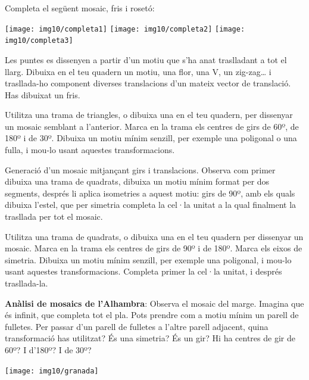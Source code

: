 \begin{mylist}
 
\exer \spen Completa el següent mosaic, fris i rosetó:
\begin{center}
	\texttt{[image: img10/completa1]}
	\texttt{[image: img10/completa2]}
	\texttt{[image: img10/completa3]}
\end{center}
	
\exer  Les puntes es dissenyen a partir d'un motiu que s'ha anat traslladant a tot el llarg. Dibuixa en el teu quadern un motiu, una flor, una V, un zig-zag{\dots} i trasllada-ho component diverses translacions d'un mateix vector de translació. Has dibuixat un fris.

 
\exer  Utilitza una trama de triangles, o dibuixa una en el teu quadern, per dissenyar un mosaic semblant a l'anterior. Marca en la trama els centres de girs de 60º, de 180º i de 30º. Dibuixa un motiu mínim senzill, per exemple una poligonal o una fulla, i mou-lo usant aquestes transformacions.

	\exer   Generació d'un mosaic mitjançant girs i translacions. Observa com primer dibuixa una trama de quadrats, dibuixa un motiu mínim format per dos segments, després li aplica isometries a aquest motiu: girs de 90º, amb els quals dibuixa l'estel, que per simetria completa la cel·la unitat a la qual finalment la trasllada per tot el mosaic. 
	
	
	
	\exer  Utilitza una trama de quadrats, o dibuixa una en el teu quadern per dissenyar un mosaic. Marca en la trama els centres de girs de 90º i de 180º. Marca els eixos de simetria. Dibuixa un motiu mínim senzill, per exemple una poligonal, i mou-lo usant aquestes transformacions. Completa primer la cel·la unitat, i després trasllada-la.
	
	\vspace{-1.5cm}
	\exer \begin{minipage}[t]{0.65\textwidth}
		 \textbf{Anàlisi de mosaics de l'Alhambra}: Observa el mosaic del marge. Imagina que és infinit, que completa tot el pla. Pots prendre com a motiu mínim un parell de fulletes. Per passar d'un parell de fulletes a l'altre parell adjacent, quina transformació has utilitzat? És una simetria? És un gir? Hi ha centres de gir de 60º? I d'180º? I de 30º? 
	\end{minipage}
	\begin{minipage}{0.3\textwidth}
		\centering
		\vspace{1.5cm}
		\texttt{[image: img10/granada]}
	\end{minipage}


\end{mylist}
